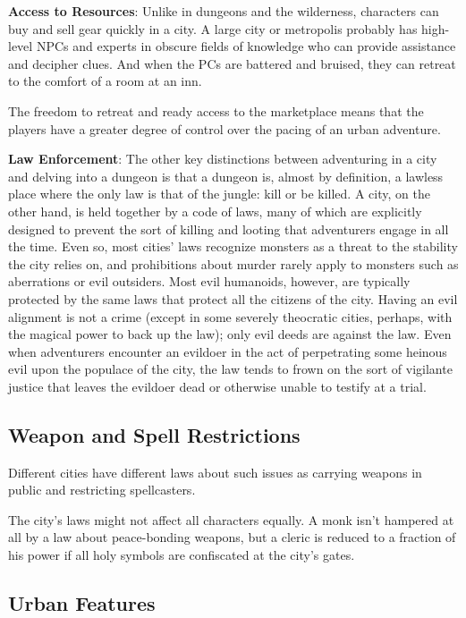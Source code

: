 \textbf{Access to Resources}: Unlike in dungeons and the wilderness, characters can buy and sell gear quickly in a city. A large city or metropolis probably has high-level NPCs and experts in obscure fields of knowledge who can provide assistance and decipher clues. And when the PCs are battered and bruised, they can retreat to the comfort of a room at an inn.
				
The freedom to retreat and ready access to the marketplace means that the players have a greater degree of control over the pacing of an urban adventure.
				
\textbf{ Law Enforcement}: The other key distinctions between adventuring in a city and delving into a dungeon is that a dungeon is, almost by definition, a lawless place where the only law is that of the jungle: kill or be killed. A city, on the other hand, is held together by a code of laws, many of which are explicitly designed to prevent the sort of killing and looting that adventurers engage in all the time. Even so, most cities' laws recognize monsters as a threat to the stability the city relies on, and prohibitions about murder rarely apply to monsters such as aberrations or evil outsiders. Most evil humanoids, however, are typically protected by the same laws that protect all the citizens of the city. Having an evil alignment is not a crime (except in some severely theocratic cities, perhaps, with the magical power to back up the law); only evil deeds are against the law. Even when adventurers encounter an evildoer in the act of perpetrating some heinous evil upon the populace of the city, the law tends to frown on the sort of vigilante justice that leaves the evildoer dead or otherwise unable to testify at a trial.
				
\subsection{Weapon and Spell Restrictions}

				
Different cities have different laws about such issues as carrying weapons in public and restricting spellcasters.
				
The city's laws might not affect all characters equally. A monk isn't hampered at all by a law about peace-bonding weapons, but a cleric is reduced to a fraction of his power if all holy symbols are confiscated at the city's gates.
				
\subsection{Urban Features}

